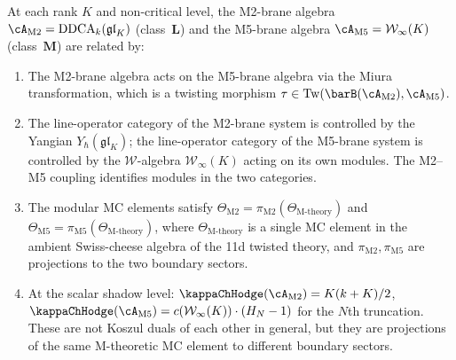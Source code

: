 \begin{conjecture}
\label{conj:M2-M5-duality}
At each rank $K$ and non-critical level, the M2-brane algebra
$\cA_{\mathrm{M2}} = \mathrm{DDCA}_k(\mathfrak{gl}_K)$
\textup{(}class~$\mathbf{L}$\textup{)} and the M5-brane algebra
$\cA_{\mathrm{M5}} = \mathcal{W}_\infty(K)$
\textup{(}class~$\mathbf{M}$\textup{)} are related by:
\begin{enumerate}[label=\textup{(\roman*)},nosep]
\item The M2-brane algebra acts on the M5-brane algebra via the
 Miura transformation, which is a twisting morphism
 $\tau \in \operatorname{Tw}(\barB(\cA_{\mathrm{M2}}), \cA_{\mathrm{M5}})$.

\item The line-operator category of the M2-brane system is
 controlled by the Yangian $Y_\hbar(\mathfrak{gl}_K)$; the
 line-operator category of the M5-brane system is controlled by
 the $\mathcal{W}$-algebra $\mathcal{W}_\infty(K)$ acting on its
 own modules. The M2--M5 coupling identifies modules in the two
 categories.

\item The modular MC elements satisfy
 $\Theta_{\mathrm{M2}} = \pi_{\mathrm{M2}}(\Theta_{\mathrm{M\text{-}theory}})$
 and
 $\Theta_{\mathrm{M5}} = \pi_{\mathrm{M5}}(\Theta_{\mathrm{M\text{-}theory}})$,
 where $\Theta_{\mathrm{M\text{-}theory}}$ is a single MC element
 in the ambient Swiss-cheese algebra of the 11d twisted theory, and
 $\pi_{\mathrm{M2}}, \pi_{\mathrm{M5}}$ are projections to the two
 boundary sectors.

\item At the scalar shadow level:
 $\kappaChHodge(\cA_{\mathrm{M2}}) = K(k + K)/2$,
 $\kappaChHodge(\cA_{\mathrm{M5}}) = c(\mathcal{W}_\infty(K)) \cdot (H_N - 1)$
 for the $N$th truncation.
 These are not Koszul duals of each other in general, but they
 are projections of the same M-theoretic MC element to different
 boundary sectors.
\end{enumerate}
\end{conjecture}

